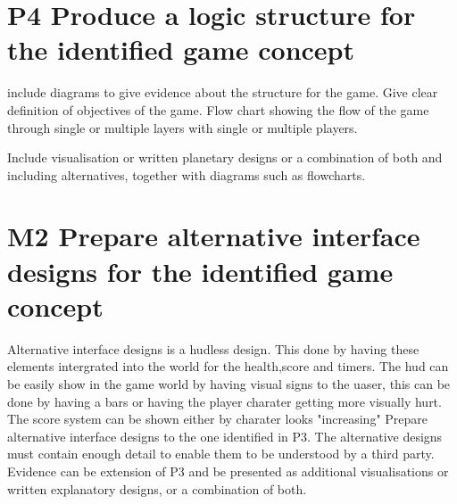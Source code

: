 \documentclass{article}
\begin{document}
\section{P4 Produce a logic structure for the identified game concept}

include diagrams to give evidence about the structure for the game. Give clear definition of objectives of the game. Flow chart showing the flow of the game through single or multiple layers with single or multiple players.

Include visualisation or written planetary designs or a combination of both and including alternatives, together with diagrams such as flowcharts.






\section{M2 Prepare alternative interface designs for the identified game concept}
Alternative interface designs is a hudless design. This done by having these elements intergrated into the world for the health,score and timers. The hud can be easily show in the game world by having visual signs to the uaser, this can be done by having a bars or having the player charater getting more visually hurt. The score system can be shown either by charater looks "increasing"
Prepare alternative interface designs to the one identified in P3. The alternative designs must contain enough detail to enable them to be understood by a third party. Evidence can be extension of P3 and be presented as additional visualisations or written explanatory designs, or a combination of both.
\end{document}
